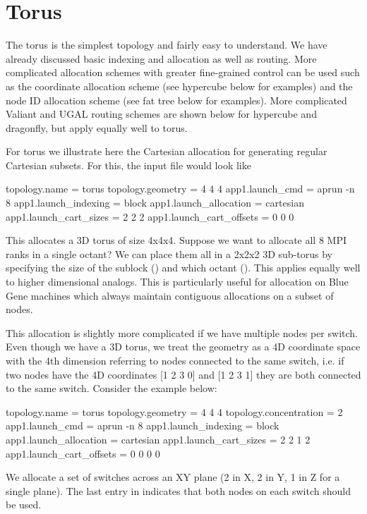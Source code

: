 \section{Torus}
\label{subsec:tutorial:hypercube}

The torus is the simplest topology and fairly easy to understand.
We have already discussed basic indexing and allocation as well as routing.
More complicated allocation schemes with greater fine-grained control can be used such as the
coordinate allocation scheme (see hypercube below for examples) and the node ID allocation scheme (see fat tree below for examples).
More complicated Valiant and UGAL routing schemes are shown below for hypercube and dragonfly,
but apply equally well to torus.

For torus we illustrate here the Cartesian allocation for generating regular Cartesian subsets.
For this, the input file would look like 

\begin{ViFile}
topology.name = torus
topology.geometry = 4 4 4
app1.launch_cmd = aprun -n 8
app1.launch_indexing = block
app1.launch_allocation = cartesian
app1.launch_cart_sizes = 2 2 2
app1.launch_cart_offsets = 0 0 0
\end{ViFile}

This allocates a 3D torus of size 4x4x4.
Suppose we want to allocate all 8 MPI ranks in a single octant?
We can place them all in a 2x2x2 3D sub-torus by specifying the size of the sublock 
() and which octant ().
This applies equally well to higher dimensional analogs.
This is particularly useful for allocation on Blue Gene machines
which always maintain contiguous allocations on a subset of nodes.

This allocation is slightly more complicated if we have multiple nodes per switch.
Even though we have a 3D torus, 
we treat the geometry as a 4D coordinate space with the 4th dimension referring to nodes connected to the same switch, 
i.e. if two nodes have the 4D coordinates [1 2 3 0] and [1 2 3 1] they are both connected to the same switch.
Consider the example below:

\begin{ViFile}
topology.name = torus
topology.geometry = 4 4 4
topology.concentration = 2
app1.launch_cmd = aprun -n 8
app1.launch_indexing = block
app1.launch_allocation = cartesian
app1.launch_cart_sizes = 2 2 1 2
app1.launch_cart_offsets = 0 0 0 0
\end{ViFile}

We allocate a set of switches across an XY plane (2 in X, 2 in Y, 1 in Z for a single plane).
The last entry in  indicates that both nodes on each switch should be used.


